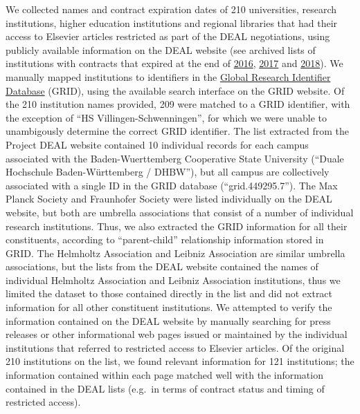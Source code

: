 \documentclass[
]{article}
\begin{document}
We collected names and contract expiration dates of 210 universities, research institutions, higher education institutions and regional libraries that had their access to Elsevier articles restricted as part of the DEAL negotiations, using publicly available information on the DEAL website (see archived lists of institutions with contracts that expired at the end of \href{(https://web.archive.org/web/20191212094238/https://www.projekt-deal.de/vertragskuendigungen_elsevier/)}{2016}, \href{(https://web.archive.org/web/20191212094842/https://www.projekt-deal.de/vertragskundigungen-elsevier-2017/)}{2017} and \href{(https://web.archive.org/web/20191114074949/https://www.projekt-deal.de/vertragskundigungen-elsevier-2018/)}{2018}). We manually mapped institutions to identifiers in the \href{https://www.grid.ac/}{Global Research Identifier Database} (GRID), using the available search interface on the GRID website. Of the 210 institution names provided, 209 were matched to a GRID identifier, with the exception of ``HS Villingen-Schwenningen'', for which we were unable to unambigously determine the correct GRID identifier. The list extracted from the Project DEAL website contained 10 individual records for each campus associated with the Baden-Wuerttemberg Cooperative State University (``Duale Hochschule Baden-Württemberg / DHBW''), but all campus are collectively associated with a single ID in the GRID database (``grid.449295.7''). The Max Planck Society and Fraunhofer Society were listed individually on the DEAL website, but both are umbrella associations that consist of a number of individual research institutions. Thus, we also extracted the GRID information for all their constituents, according to ``parent-child'' relationship information stored in GRID. The Helmholtz Association and Leibniz Association are similar umbrella associations, but the lists from the DEAL website contained the names of individual Helmholtz Association and Leibniz Association institutions, thus we limited the dataset to those contained directly in the list and did not extract information for all other constituent institutions. We attempted to verify the information contained on the DEAL website by manually searching for press releases or other informational web pages issued or maintained by the individual institutions that referred to restricted access to Elsevier articles. Of the original 210 institutions on the list, we found relevant information for 121 institutions; the information contained within each page matched well with the information contained in the DEAL lists (e.g.~in terms of contract status and timing of restricted access).
\end{document}
